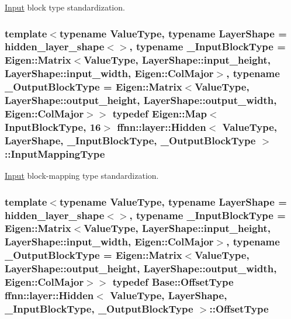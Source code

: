 \hyperlink{classffnn_1_1layer_1_1_input}{Input} block type standardization. 

\hypertarget{classffnn_1_1layer_1_1_hidden_a9297d5b8ac45dc288ee1b91f15bb4047}{
\subsubsection[{Input\-Mapping\-Type}]{\setlength{\rightskip}{0pt plus 5cm}template$<$typename Value\-Type, typename Layer\-Shape = hidden\-\_\-layer\-\_\-shape$<$$>$, typename \-\_\-\-Input\-Block\-Type = Eigen\-::\-Matrix$<$\-Value\-Type, Layer\-Shape\-::input\-\_\-height,  Layer\-Shape\-::input\-\_\-width,  Eigen\-::\-Col\-Major$>$, typename \-\_\-\-Output\-Block\-Type = Eigen\-::\-Matrix$<$\-Value\-Type, Layer\-Shape\-::output\-\_\-height, Layer\-Shape\-::output\-\_\-width, Eigen\-::\-Col\-Major$>$$>$ typedef Eigen\-::\-Map$<${\bf Input\-Block\-Type}, 16$>$ {\bf ffnn\-::layer\-::\-Hidden}$<$ Value\-Type, Layer\-Shape, \-\_\-\-Input\-Block\-Type, \-\_\-\-Output\-Block\-Type $>$\-::{\bf Input\-Mapping\-Type}}}\label{classffnn_1_1layer_1_1_hidden_a9297d5b8ac45dc288ee1b91f15bb4047}


\hyperlink{classffnn_1_1layer_1_1_input}{Input} block-\/mapping type standardization. 

\hypertarget{classffnn_1_1layer_1_1_hidden_ae2409b970adafb0ebc9b2eec62c4aac4}{
\subsubsection[{Offset\-Type}]{\setlength{\rightskip}{0pt plus 5cm}template$<$typename Value\-Type, typename Layer\-Shape = hidden\-\_\-layer\-\_\-shape$<$$>$, typename \-\_\-\-Input\-Block\-Type = Eigen\-::\-Matrix$<$\-Value\-Type, Layer\-Shape\-::input\-\_\-height,  Layer\-Shape\-::input\-\_\-width,  Eigen\-::\-Col\-Major$>$, typename \-\_\-\-Output\-Block\-Type = Eigen\-::\-Matrix$<$\-Value\-Type, Layer\-Shape\-::output\-\_\-height, Layer\-Shape\-::output\-\_\-width, Eigen\-::\-Col\-Major$>$$>$ typedef {\bf Base\-::\-Offset\-Type} {\bf ffnn\-::layer\-::\-Hidden}$<$ Value\-Type, Layer\-Shape, \-\_\-\-Input\-Block\-Type, \-\_\-\-Output\-Block\-Type $>$\-::{\bf Offset\-Type}}}\label{classffnn_1_1layer_1_1_hidden_ae2409b970adafb0ebc9b2eec62c4aac4}


